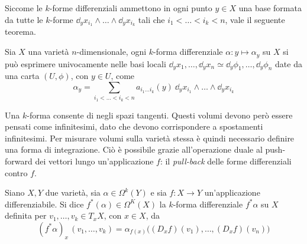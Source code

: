 Siccome le $k$-forme differenziali ammettono in ogni punto $y \in X$ una base formata da tutte le $k$-forme $\dd_y x_{i_1} \wedge \ldots \wedge \dd_y x_{i_k}$ tali che $i_1 < \ldots < i_k < n$, vale il seguente teorema.

\begin{theorem}
  Sia $X$ una varietà $n$-dimensionale, ogni $k$-forma differenziale $\alpha: y \mapsto \alpha_y$ su $X$ si può esprimere univocamente nelle basi locali $\dd_y x_1, \ldots, \dd_y x_n \simeq \dd_y \phi_1, \ldots, \dd_y \phi_n$ date da una carta $(U, \phi)$, con $y \in U$, come 
  \begin{equation}
    \alpha_y = \sum_{i_1 < \ldots < i_k < n} a_{i_1\ldots i_k}(y)\ \dd_y x_{i_1} \wedge \ldots \wedge \dd_y x_{i_k}
  \end{equation}
\end{theorem}

Una $k$-forma consente di  negli spazi tangenti. Questi volumi devono però essere pensati come infinitesimi, dato che devono corrispondere a spostamenti infinitesimi. Per misurare volumi sulla varietà stessa è quindi necessario definire una forma di integrazione. Ciò è possibile grazie all'operazione duale al push-forward dei vettori lungo un'applicazione $f$: il \emph{pull-back} delle forme differenziali contro $f$.
\begin{definition}
  Siano $X,Y$ due varietà, sia $\alpha \in \Omega^k (Y)$ e sia $f : X\to Y$ un'applicazione differenziabile. Si dice  $f^*(\alpha) \in  \Omega^K(X)$ la $k$-forma differenziale $f^* \alpha$ su $X$ definita per $v_1, \ldots, v_k \in T_x X$, con $x \in X$, da \begin{equation}
  (f^*\alpha)_x\, (v_1, \ldots, v_k) = \alpha_{f(x)}\big((D_x f)(v_1), \ldots, (D_x f)(v_n)\big)
  \end{equation}  
\end{definition}

